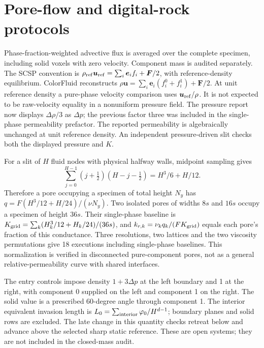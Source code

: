 \documentclass[11pt]{article}
\begin{document}
\section{Pore-flow and digital-rock protocols}
Phase-fraction-weighted advective flux is averaged over the complete specimen,
including solid voxels with zero velocity. Component mass is audited separately.
The SCSP convention is $\rho_{\rm ref}\bm u_{\rm ref}=\sum_i\bm e_i f_i+
\bm F/2$, with reference-density equilibrium. ColorFluid reconstructs
$\rho\bm u=\sum_i\bm e_i(f_i^0+f_i^1)+\bm F/2$. At unit reference density a
pure-phase velocity comparison uses $\bm u_{\rm ref}/\rho$. It is not expected
to be raw-velocity equality in a nonuniform pressure field. The pressure
report now displays $\Delta\rho/3$ as $\Delta p$; the previous factor three
was included in the single-phase permeability prefactor. The reported
permeability is algebraically unchanged at unit reference density. An
independent pressure-driven slit checks both the displayed pressure and $K$.

For a slit of $H$ fluid nodes with physical halfway walls, midpoint sampling
gives
\begin{equation}
 \sum_{j=0}^{H-1}(j+\tfrac12)(H-j-\tfrac12)=H^3/6+H/12.
\end{equation}
Therefore a pore occupying a specimen of total height $N_y$ has
$q=F(H^3/12+H/24)/(\nu N_y)$. Two isolated pores of widths $8s$ and $16s$
occupy a specimen of height $36s$. Their single-phase baseline is
$K_{\rm grid}=\sum_k(H_k^3/12+H_k/24)/(36s)$, and
$k_{r,k}=\nu_kq_k/(FK_{\rm grid})$ equals each pore's fraction of this
conductance. Three resolutions, two lattices and the two viscosity permutations
give 18 executions including single-phase baselines. This normalization is
verified in disconnected pure-component pores, not as a general
relative-permeability curve with shared interfaces.

The entry controls impose density $1+3\Delta p$ at the left boundary and 1
at the right, with component 0 supplied on the left and component 1 on the
right. The solid value is a prescribed 60-degree angle through component 1.
The interior equivalent invasion length is
$L_0=\sum_{\rm interior}\varphi_0/H^{d-1}$; boundary planes and solid rows
are excluded. The late change in this quantity checks retreat below and
advance above the selected sharp static reference. These are open systems;
they are not included in the closed-mass audit.
\end{document}
